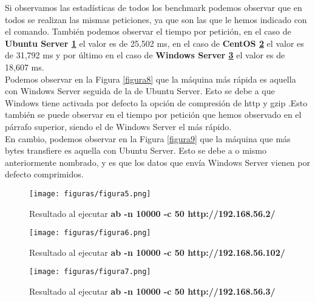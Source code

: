 Si observamos las estadísticas de todos los benchmark podemos observar que en todos se realizan las mismas peticiones, ya que son las que le hemos indicado con el comando. También podemos observar el tiempo por petición, en el caso de \textbf{Ubuntu Server \ref{figura5}} el valor es de 25,502 ms, en el caso de \textbf{CentOS \ref{figura6}} el valor es de 31,792 ms y por último en el caso de \textbf{Windows Server \ref{figura7}} el valor es de 18,607 ms.\\
Podemos observar en la Figura  \ref{figura8} que la máquina más rápida es aquella con Windows Server seguida de la de Ubuntu Server. Esto se debe a que Windows tiene activada por defecto la opción de compresión de http y gzip \cite{gzip} \cite{http-comp}.Esto también se puede observar en el tiempo por petición que hemos observado en el párrafo superior, siendo el de Windows Server el más rápido.\\
En cambio, podemos observar en la Figura \ref{figura9} que la máquina que más bytes transfiere es aquella con Ubuntu Server. Esto se debe a o mismo anteriormente nombrado, y es que los datos que envía Windows Server vienen por defecto comprimidos.

\begin{figure}[H] %
	\centering
	\texttt{[image: figuras/figura5.png]}  %
	
	
	\caption{Resultado al ejecutar \textbf{ab -n 10000 -c 50 http://192.168.56.2/}}
	\label{figura5}
\end{figure}

\begin{figure}[H] %
	\centering
	\texttt{[image: figuras/figura6.png]}  %
	
	
	\caption{Resultado al ejecutar \textbf{ab -n 10000 -c 50 http://192.168.56.102/}}
	\label{figura6}
\end{figure}
\begin{figure}[H] %
	\centering
	\texttt{[image: figuras/figura7.png]}  %
	
	
	\caption{Resultado al ejecutar \textbf{ab -n 10000 -c 50 http://192.168.56.3/}}
	\label{figura7}
\end{figure}

